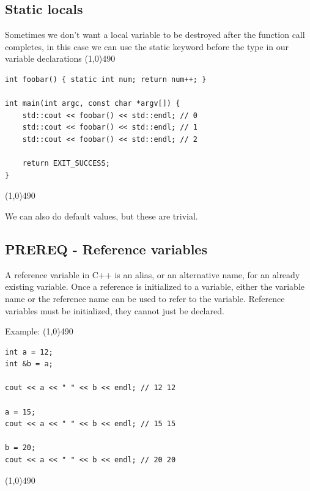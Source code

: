 \documentclass{report}
\begin{document}
    \pagebreak \bigbreak \noindent 
    \subsection{Static locals}
    \bigbreak \noindent 
    Sometimes we don't want a local variable to be destroyed after the function call completes, in this case we can use the static keyword before the type in our variable declarations
    \bigbreak \noindent 
    \line(1,0){490}
    \begin{verbatim}
int foobar() { static int num; return num++; }

int main(int argc, const char *argv[]) {
    std::cout << foobar() << std::endl; // 0
    std::cout << foobar() << std::endl; // 1
    std::cout << foobar() << std::endl; // 2

    return EXIT_SUCCESS;
}
    \end{verbatim}
    \line(1,0){490}

    \bigbreak \noindent 
    We can also do default values, but these are trivial.

    \bigbreak \noindent 
    \subsection{PREREQ - Reference variables}
    \bigbreak \noindent 
    \begin{concept}
 A reference variable in C++ is an alias, or an alternative name, for an already existing variable. Once a reference is initialized to a variable, either the variable name or the reference name can be used to refer to the variable. Reference variables must be initialized, they cannot just be declared.
	\end{concept}
    \bigbreak \noindent 
    Example:
    \bigbreak \noindent 
    \line(1,0){490}
    \begin{verbatim}
int a = 12;
int &b = a; 

cout << a << " " << b << endl; // 12 12

a = 15;
cout << a << " " << b << endl; // 15 15

b = 20; 
cout << a << " " << b << endl; // 20 20

    \end{verbatim}
    \line(1,0){490}

    \pagebreak \bigbreak \noindent 
\end{document}
